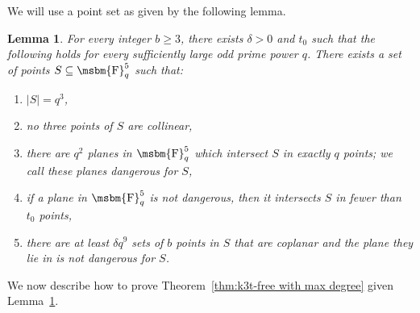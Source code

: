 \documentclass[12pt]{article}
\newtheorem{lemma}[theorem]{Lemma}
\newcommand{\FF}{\mbox{\msbm{F}}}
\begin{document}
We will use a point set as given by the following lemma. 

\begin{lemma}\label{goodsset}
    For every integer $b\geq 3$, there exists $\delta > 0$ and $t_0$ such that the following holds for every sufficiently large odd prime power $q$. There exists a set of points $S \subseteq \FF_q^5$ such that:
    \begin{enumerate}
        \item $|S| = q^3$, 
        \item no three points of $S$ are collinear,
        \item there are $q^2$ planes in $ \FF_q^5$ which intersect $S$ in exactly $q$ points; we call these planes  \emph{dangerous} for $S$,
        \item if a plane in $ \FF_q^5$ is not dangerous, then it intersects $S$ in fewer than $t_0$ points, 
        \item there are at least $\delta q^9$ sets of $b$ points in $S$ that are coplanar and the plane they lie in is not dangerous for $S$.  
    \end{enumerate}
    \end{lemma}






We now describe how to prove Theorem~\ref{thm:k3t-free with max degree} given Lemma~\ref{goodsset}. 
\end{document}
